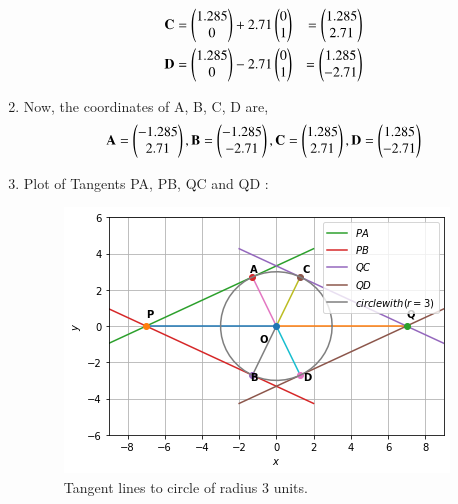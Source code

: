 \documentclass[journal,12pt,twocolumn]{IEEEtran}
\begin{document}
\begin{enumerate}
\begin{align}
\mathbf{C}&=\begin{pmatrix}1.285\\0\end{pmatrix}+ 2.71\begin{pmatrix}0\\1\end{pmatrix}&=\begin{pmatrix}1.285\\2.71\end{pmatrix}
\\
\mathbf{D}&=\begin{pmatrix}1.285\\0\end{pmatrix}- 2.71\begin{pmatrix}0\\1\end{pmatrix}&=\begin{pmatrix}1.285\\-2.71\end{pmatrix}
\end{align}
\item Now, the coordinates of  A, B, C, D are,
\begin{align}
 \mathbf{A}=\begin{pmatrix}-1.285\\2.71\end{pmatrix},\mathbf{B} =\begin{pmatrix}-1.285\\-2.71\end{pmatrix}, \mathbf{C}=\begin{pmatrix}1.285\\2.71\end{pmatrix},\mathbf{D}=\begin{pmatrix}1.285\\-2.71\end{pmatrix}
\end{align}
\item Plot of Tangents PA, PB, QC and QD :
\begin{figure}[ht]
    \centering
    \includegraphics[width=\columnwidth]{FIGURE3.png}
    \caption{Tangent lines to circle of radius 3 units.}
    \label{fig:Tangent lines to circle of radius 3 units.}
\end{figure}
\end{enumerate}
\end{document}
